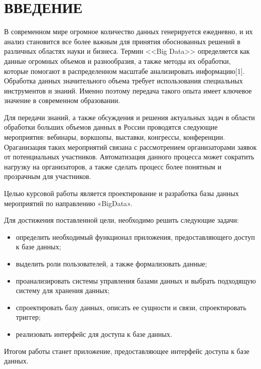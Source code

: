 \section*{ВВЕДЕНИЕ}

В современном мире огромное количество данных генерируется ежедневно, и их анализ становится все более важным для принятия обоснованных решений в различных областях науки и бизнеса. Термин <<Big Data>>\cite{bd-def} определяется как данные огромных объемов и
разнообразия, а также методы их обработки, которые помогают в
распределенном масштабе анализировать информацию[1]. Обработка данных значительного объема требует использования специальных инструментов и знаний. Именно поэтому передача такого опыта имеет ключевое значение в современном образовании.

Для передачи знаний, а также обсуждения и решения актуальных задач в области обработки больших объемов данных в России проводятся следующие мероприятия\cite{ai-gov}: вебинары, воркшопы, выставки, конгрессы, конференции. Ораганизация таких мероприятий связана с рассмотрением организаторами заявок от потенциальных участников. Автоматизация данного процесса может сократить нагрузку на организаторов, а также сделать процесс более понятным и прозрачным для участников.

Целью курсовой работы является проектирование и разработка базы данных мероприятий по направлению «BigData».

Для достижения поставленной цели, необходимо решить следующие задачи:
\begin{itemize}[label=---]
	\item определить необходимый функционал приложения, предоставляющего доступ к базе данных;
	\item выделить роли пользователей, а также формализовать данные;
	\item проанализировать системы управления базами данных и выбрать подходящую систему для хранения данных;
	\item спроектировать базу данных, описать ее сущности и связи, спроектировать триггер;
	\item реализовать интерфейс для доступа к базе данных.
\end{itemize}

Итогом работы станет приложение, предоставляющее интерфейс доступа к базе данных.
\pagebreak
